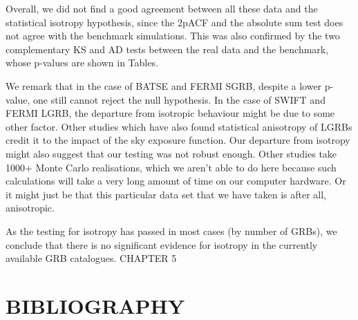 \documentclass[12pt]{article}
\begin{document}
Overall, we did not find a good agreement between all these data and the
statistical isotropy hypothesis, since the 2pACF and the absolute sum
test does not agree with the benchmark simulations. This was also confirmed by
the two complementary KS and AD tests between the real data and the
benchmark, whose p-values are shown in Tables.

We remark that in the case of BATSE and FERMI SGRB, despite a lower
p-value, one still cannot reject the null hypothesis. In the case of
SWIFT and FERMI LGRB, the departure from isotropic behaviour might be due to some
other factor. Other studies which have also found statistical anisotropy
of LGRBs credit it to the impact of the sky exposure function. Our
departure from isotropy might also suggest that our testing was not
robust enough. Other studies take 1000+ Monte Carlo realisations, which
we aren't able to do here because such calculations will take a very
long amount of time on our computer hardware. Or it might just be that
this particular data set that we have taken is after all, anisotropic.

As the testing for isotropy has passed in most cases (by number of
GRBs), we conclude that there is no significant evidence for isotropy in the currently available GRB catalogues.
\newpage
{\huge CHAPTER 5}
\section{BIBLIOGRAPHY}
\printbibliography
\end{document}
